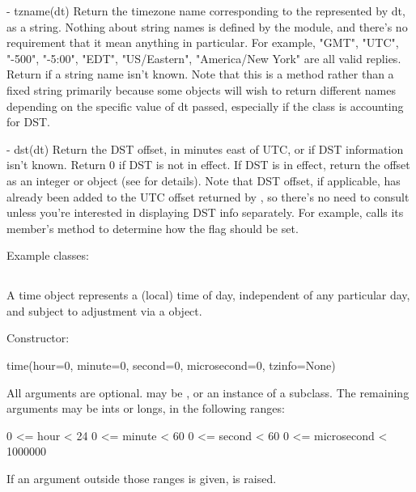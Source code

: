   - tzname(dt)
    Return the timezone name corresponding to the  represented
    by dt, as a string.  Nothing about string names is defined by the
     module, and there's no requirement that it mean anything
    in particular.  For example, "GMT", "UTC", "-500", "-5:00", "EDT",
    "US/Eastern", "America/New York" are all valid replies.  Return
     if a string name isn't known.  Note that this is a method
    rather than a fixed string primarily because some  objects
    will wish to return different names depending on the specific value
    of dt passed, especially if the  class is accounting for DST.

  - dst(dt)
    Return the DST offset, in minutes east of UTC, or  if
    DST information isn't known.  Return 0 if DST is not in effect.
    If DST is in effect, return the offset as an integer or
     object (see  for details).
    Note that DST offset, if applicable, has
    already been added to the UTC offset returned by
    , so there's no need to consult 
    unless you're interested in displaying DST info separately.  For
    example,  calls its 
    member's  method to determine how the
     flag should be set.

Example  classes:




\subsection{ \label{datetime-timetz}}

A time object represents a (local) time of day, independent of any
particular day, and subject to adjustment via a  object.

Constructor:

    time(hour=0, minute=0, second=0, microsecond=0, tzinfo=None)

    All arguments are optional.   may be , or
    an instance of a  subclass.  The remaining arguments
    may be ints or longs, in the following ranges:

        0 <= hour < 24
        0 <= minute < 60
        0 <= second < 60
        0 <= microsecond < 1000000

    If an argument outside those ranges is given,
     is raised.

